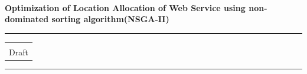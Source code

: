\documentclass{llncs}
\begin{document}
\thispagestyle{empty}
\begin{flushleft}
\LARGE\bfseries \\
Optimization of Location Allocation of Web Service using non-dominated sorting algorithm(NSGA-II)
\\[2cm]
\end{flushleft}
\rule{\textwidth}{1pt}
\vspace{2pt}
\begin{flushright}
\Huge
\begin{tabular}{@{}l}
\\
\\[6pt]
{\Large Draft}
\end{tabular}
\end{flushright}
\rule{\textwidth}{1pt}
\vfill
\newpage
%
\end{document}
